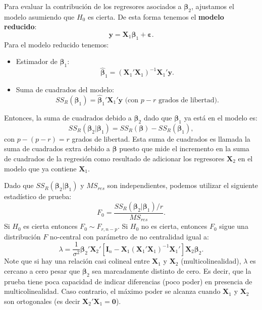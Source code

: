 \documentclass[
]{article}
\providecommand{\tightlist}{%
  \setlength{\itemsep}{0pt}\setlength{\parskip}{0pt}}
\begin{document}
Para evaluar la contribución de los regresores asociados a \(\boldsymbol \beta_{2}\), ajustamos el modelo asumiendo que \(H_{0}\) es cierta. De esta forma tenemos el \textbf{modelo reducido}:
\[
\boldsymbol y= \boldsymbol X_{1}\boldsymbol \beta_{1} + \boldsymbol \varepsilon.
\]
Para el modelo reducido tenemos:

\begin{itemize}
\tightlist
\item
  Estimador de \(\boldsymbol \beta_{1}\):
  \[
  \widehat{\boldsymbol \beta}_{1} = (\boldsymbol X_{1}'\boldsymbol X_{1})^{-1}\boldsymbol X_{1}'\boldsymbol y.
  \]
\item
  Suma de cuadrados del modelo:
  \[
  SS_{R}(\boldsymbol \beta_{1}) = \widehat{\boldsymbol \beta}_{1}'\boldsymbol X_{1}'\boldsymbol y\mbox{ (con $p-r$ grados de libertad)}.
  \]
\end{itemize}

Entonces, la suma de cuadrados debido a \(\boldsymbol \beta_{2}\) dado que \(\boldsymbol \beta_{1}\) ya está en el modelo es:
\[
SS_{R}(\boldsymbol \beta_{2}| \boldsymbol \beta_{1}) = SS_{R}(\boldsymbol \beta) - SS_{R}(\boldsymbol \beta_{1}),
\]
con \(p-(p-r)=r\) grados de libertad. Esta suma de cuadrados es llamada la suma de cuadrados extra debido a \(\boldsymbol \beta\) puesto que mide el incremento en la suma de cuadrados de la regresión como resultado de adicionar los regresores \(\boldsymbol X_{2}\) en el modelo que ya contiene \(\boldsymbol X_{1}\).

Dado que \(SS_{R}(\boldsymbol \beta_{2}| \boldsymbol \beta_{1})\) y \(MS_{res}\) son independientes, podemos utilizar el siguiente estadístico de prueba:
\[
F_{0} = \frac{SS_{R}(\boldsymbol \beta_{2}|\boldsymbol \beta_{1})/r}{MS_{res}}.
\]
Si \(H_{0}\) es cierta entonces \(F_{0} \sim F_{r,n-p}\). Si \(H_{0}\) no es cierta, entonces \(F_{0}\) sigue una distribución \(F\) no-central con parámetro de no centralidad igual a:
\[
\lambda = \frac{1}{\sigma^{2}}\boldsymbol \beta_{2}'\boldsymbol X_{2}'\left[ \boldsymbol I_{n} - \boldsymbol X_{1}(\boldsymbol X_{1}'\boldsymbol X_{1})^{-1}\boldsymbol X_{1}'\right]\boldsymbol X_{2}\boldsymbol \beta_{2}.
\]
Note que si hay una relación casi colineal entre \(\boldsymbol X_{1}\) y \(\boldsymbol X_{2}\) (multicolinealidad), \(\lambda\) es cercano a cero pesar que \(\boldsymbol \beta_{2}\) sea marcadamente distinto de cero. Es decir, que la prueba tiene poca capacidad de indicar diferencias (poco poder) en presencia de multicolinealidad. Caso contrario, el máximo poder se alcanza cuando \(\boldsymbol X_{1}\) y \(\boldsymbol X_{2}\) son ortogonales (es decir \(\boldsymbol X_{2}'\boldsymbol X_{1} = \boldsymbol 0\)).
\end{document}

